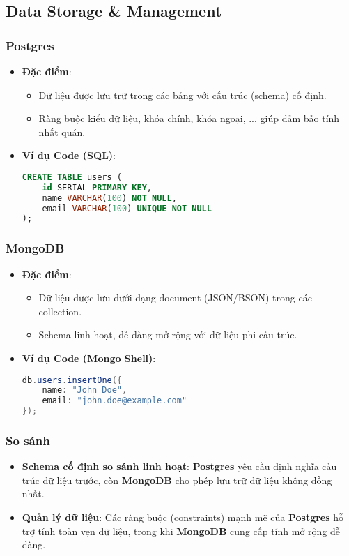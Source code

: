 \subsection{Data Storage \& Management}

\subsubsection{Postgres}

\begin{itemize}
    \item \textbf{Đặc điểm}:
    \begin{itemize}
        \item Dữ liệu được lưu trữ trong các bảng với cấu trúc (schema) cố định.
        \item Ràng buộc kiểu dữ liệu, khóa chính, khóa ngoại, ... giúp đảm bảo tính nhất quán.
    \end{itemize}
    \item \textbf{Ví dụ Code (SQL)}: 
        \begin{lstlisting}[language=sql]
CREATE TABLE users (
    id SERIAL PRIMARY KEY,
    name VARCHAR(100) NOT NULL,
    email VARCHAR(100) UNIQUE NOT NULL
);\end{lstlisting}
\end{itemize}

\noindent
\subsubsection{MongoDB}

\begin{itemize}
    \item \textbf{Đặc điểm}:
    \begin{itemize}
        \item Dữ liệu được lưu dưới dạng document (JSON/BSON) trong các collection.
        \item Schema linh hoạt, dễ dàng mở rộng với dữ liệu phi cấu trúc.
    \end{itemize}
    \item \textbf{Ví dụ Code (Mongo Shell)}: 
        \begin{lstlisting}[language=java]
db.users.insertOne({
    name: "John Doe",
    email: "john.doe@example.com"
});\end{lstlisting}
\end{itemize}

\subsubsection{So sánh}
\begin{itemize}
    \item \textbf{Schema cố định so sánh linh hoạt}: \textbf{Postgres} yêu cầu định nghĩa cấu trúc dữ liệu trước, còn \textbf{MongoDB} cho phép lưu trữ dữ liệu không đồng nhất.
    \item \textbf{Quản lý dữ liệu}: Các ràng buộc (constraints) mạnh mẽ của \textbf{Postgres} hỗ trợ tính toàn vẹn dữ liệu, trong khi \textbf{MongoDB} cung cấp tính mở rộng dễ dàng.
\end{itemize}
